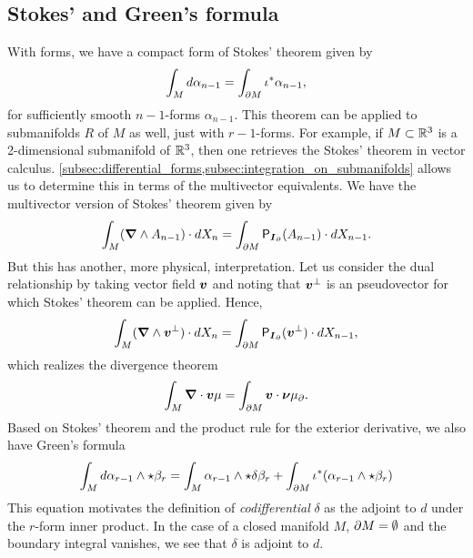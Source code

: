 \subsection{Stokes' and Green's formula}

With forms, we have a compact form of Stokes' theorem given by
\begin{equation}
\int_M d \alpha_{n-1} = \int_{{\partial M}} \iota^* \alpha_{n-1},
\end{equation}
for sufficiently smooth $n-1$-forms $\alpha_{n-1}$. This theorem can be applied to submanifolds $R$ of $M$ as well, just with $r-1$-forms. For example, if $M\subset \mathbb{R}^3$ is a 2-dimensional submanifold of $\mathbb{R}^3$, then one retrieves the Stokes' theorem in vector calculus. \cref{subsec:differential_forms,subsec:integration_on_submanifolds} allows us to determine this in terms of the multivector equivalents. We have the multivector version of Stokes' theorem given by
\begin{equation}
\label{eq:stokes_theorem}
\int_M (\boldsymbol{\nabla} \wedge A_{n-1})\cdot dX_n = \int_{\partial M} \mathsf{P}_{\boldsymbol{I}_\partial}(A_{n-1}) \cdot dX_{n-1}.
\end{equation}
But this has another, more physical, interpretation. Let us consider the dual relationship by taking vector field $\boldsymbol{v}$ and noting that $\boldsymbol{v}^\perp$ is an pseudovector for which Stokes' theorem can be applied. Hence,
\begin{equation}
\label{eq:stokes_theorem_dual}
\int_M (\boldsymbol{\nabla} \wedge \boldsymbol{v}^\perp) \cdot dX_n = \int_{\partial M} \mathsf{P}_{\boldsymbol{I}_\partial}(\boldsymbol{v}^\perp) \cdot dX_{n-1},
\end{equation}
which realizes the divergence theorem
\begin{equation}
\int_M \boldsymbol{\nabla} \cdot \boldsymbol{v} \mu = \int_{\partial M} \boldsymbol{v}\cdot \boldsymbol{\nu} \mu_\partial.
\end{equation}
Based on Stokes' theorem and the product rule for the exterior derivative, we also have Green's formula
\begin{equation}
\int_M d\alpha_{r-1} \wedge \star \beta_r = \int_M \alpha_{r-1} \wedge \star \delta \beta_r + \int_{{\partial M}} \iota^* (\alpha_{r-1} \wedge \star \beta_r)
\end{equation}
This equation motivates the definition of \emph{codifferential} $\delta$ as the adjoint to $d$ under the $r$-form inner product. In the case of a closed manifold $M$, ${\partial M} = \emptyset$ and the boundary integral vanishes, we see that $\delta$ is adjoint to $d$.

